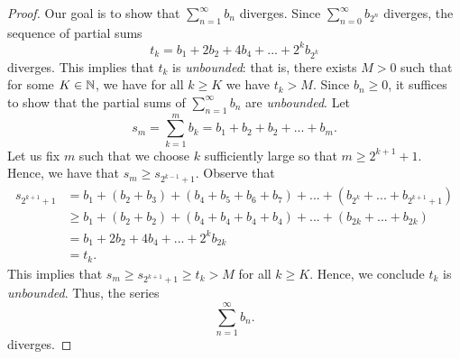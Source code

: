 \begin{proof}
    Our goal is to show that \( \sum_{n=1}^{ \infty} b_n\) diverges. Since \( \sum_{n=0}^{ \infty} b_{{2^n}} \) diverges, the sequence of partial sums 
    \[t_k = b_1 + 2b_2 + 4b_4 + ... + 2^k b_{2^k}\]
    diverges. This implies that \( t_k \) is \textit{unbounded}: that is, there exists \( M > 0 \) such that for some \( K \in \mathbb{N} \), we have for all \( k \geq K \) we have \( t_k > M \). Since \( b_n \geq 0\), it suffices to show that the partial sums of \( \sum_{n=1}^{ \infty} b_n\) are \textit{unbounded}. Let 
    \[ s_m = \sum_{k=1}^{m} b_k = b_1 + b_2 + b_2 + ... + b_m.  \]
    Let us fix \( m \) such that we choose \( k \) sufficiently large so that \( m \geq 2^{k+1} + 1 \). Hence, we have that \( s_m \geq s_{2^{k-1} + 1} \). Observe that 
    \begin{align*}
        s_{2^{k+1}+1} &= b_1 + (b_2 + b_3) + (b_4 + b_5 + b_6 + b_7) + ... + (b_{2^k} + ... + b_{2^{k+1}+1})  \\ 
                      &\geq b_1 + (b_2 + b_2) + (b_4 + b_4 + b_4 + b_4) + ... + (b_{2k} + ... + b_{2k}) \\
                      &= b_1 + 2b_2 + 4b_4 + ... + 2^k b_{2k} \\
                      &= t_k.
    \end{align*}
    This implies that \( s_m \geq s_{2^{k+1}+1} \geq t_k > M \) for all \( k \geq K\). Hence, we conclude \( t_k\) is \textit{unbounded}. Thus, the series 
    \[ \sum_{n=1}^{ \infty} b_n.\]
    diverges.
\end{proof}


